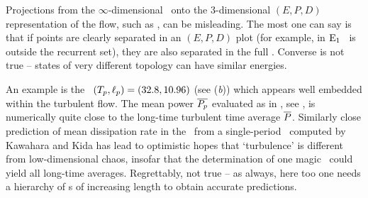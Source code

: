 Projections from the $\infty$-dimensional \statesp\ onto the 3-dimensional
$(E,P,D)$ representation of the flow, such as
, can be misleading.
The most one can say is that if points are clearly separated in an
$(E,P,D)$ plot (for example, in 
$\mathrm{E}_{1}$ \eqv\ is outside the recurrent set), they are also separated
in the full \statesp.  Converse is not true -- states of
very different topology can have similar energies.

An example is
the \rpo\ $({T_{p}},\ell_p) = (32.8,10.96)$ 
(see (\textit{b})) which appears well embedded
within the turbulent flow. The mean power $\overline{P_p}$ evaluated
as in , see ,
is numerically quite close to the long-time
turbulent time average $\overline{P}$.
Similarly close prediction of mean dissipation rate in the
\pCf\ from a single-period \po\ computed by
Kawahara and Kida has lead to
optimistic hopes that `turbulence' is different from
low-dimensional chaos, insofar that the determination of one
magic
\po\ could yield all long-time averages.
Regrettably, not true -- as always, here too one needs a hierarchy
of \po s of increasing length to obtain accurate
predictions.



